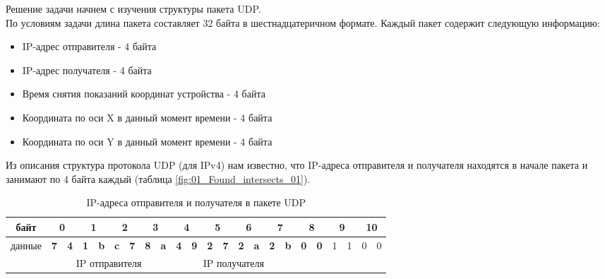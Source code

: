 \solutionSection

Решение задачи начнем с изучения структуры пакета UDP.\\
По условиям задачи длина пакета составляет 32 байта в шестнадцатеричном формате.
Каждый пакет содержит следующую информацию:
\begin{itemize}
	\item IP-адрес отправителя - 4 байта
	\item IP-адрес получателя - 4 байта
	\item Время снятия показаний координат устройства - 4 байта
	\item Координата по оси X в данный момент времени - 4 байта
	\item Координата по оси Y в данный момент времени - 4 байта
\end{itemize}

Из описания структура протокола UDP (для IPv4) нам известно, что IP-адреса отправителя и получателя находятся в начале пакета и занимают по 4 байта каждый (таблица \ref{fig:01_Found_intersects_01}).

\begin{table}[h!]
	\begin{center}
		\begin{tabular}{|c|c|c|c|c|c|c|c|c|c|c|c|c|c|c|c|c|c|c|c|c|c|c|}
			\hline
			байт   & \multicolumn{2}{c|}{0}  & \multicolumn{2}{c|}{1}  & \multicolumn{2}{c|}{2}  & \multicolumn{2}{c|}{3}  & \multicolumn{2}{c|}{4}  & \multicolumn{2}{c|}{5}  & \multicolumn{2}{c|}{6}  & \multicolumn{2}{c|}{7}  & \multicolumn{2}{c|}{8}  & \multicolumn{2}{c|}{9} & \multicolumn{2}{c|}{10} \\ \hline
			данные & \textbf{7} & \textbf{4} & \textbf{1} & \textbf{b} & \textbf{c} & \textbf{7} & \textbf{8} & \textbf{a} & \textbf{4} & \textbf{9} & \textbf{2} & \textbf{7} & \textbf{2} & \textbf{a} & \textbf{2} & \textbf{b} & \textbf{0} & \textbf{0} & 1          & 1         & 0          & 0          \\ \hline
			& \multicolumn{8}{c|}{IP отправителя}                                                                   & \multicolumn{8}{c|}{IP получателя}                                                                    &            &            &            &           &            &            \\ \hline
		\end{tabular}
		\label{table:01_Found_intersects_01}
		\caption{IP-адреса отправителя и получателя в пакете UDP}
	\end{center}
\end{table}

